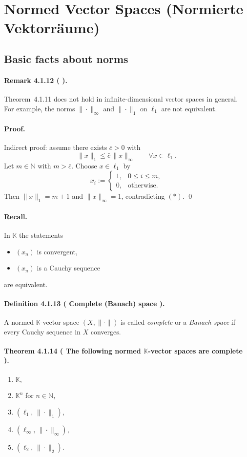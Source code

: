 \documentclass[12pt,a4paper]{article}
\newcommand{\N}{\mathbb{N}}
\newcommand{\K}{\mathbb{K}} %
\newcommand{\NumberedDefinition}[3]{%
\paragraph*{Definition #1 ( #2 ).} #3\par}
\newcommand{\NumberedTheorem}[3]{%
\paragraph*{Theorem #1 ( #2 ).} #3\par}
\newcommand{\NumberedRemark}[3]{%
\paragraph*{Remark #1 ( #2 ).} #3\par}
\theoremstyle{plain}
\theoremstyle{definition}
\theoremstyle{remark}
\begin{document}
\section{Normed Vector Spaces (Normierte Vektorräume)}

\subsection{Basic facts about norms}


\NumberedRemark{4.1.12}{}{Theorem~4.1.11 does not hold in infinite-dimensional vector spaces in general. For example, the norms $\|\cdot\|_\infty$ and $\|\cdot\|_1$ on $\ell_1$ are not equivalent.}
\paragraph{Proof.}
Indirect proof: assume there exists $\bar c>0$ with
\[
	\|x\|_{1} \le \bar c\,\|x\|_{\infty} \qquad \forall x\in\ell_{1}.\tag{$*$}
\]
Let $m\in\N$ with $m>\bar c$. Choose $x\in\ell_{1}$ by
\[
	x_i := \begin{cases} 1,& 0\le i\le m,\\ 0,& \text{otherwise.} \end{cases}
\]
Then $\|x\|_{1}=m+1$ and $\|x\|_{\infty}=1$, contradicting $(*)$. \qed

\paragraph{Recall.} In $\K$ the statements
\begin{itemize}[leftmargin=*]
	\item $(x_n)$ is convergent,
	\item $(x_n)$ is a Cauchy sequence
\end{itemize}
are equivalent.

\NumberedDefinition{4.1.13}{Complete (Banach) space}{A normed $\K$-vector space $(X,\|\cdot\|)$ is called \emph{complete} or a \emph{Banach space} if every Cauchy sequence in $X$ converges.}

\NumberedTheorem{4.1.14}{The following normed $\K$-vector spaces are complete}{\begin{enumerate}[label={(\arabic*)}, leftmargin=*]
	\item $\K$,
	\item $\K^{n}$ for $n\in\N$,
	\item $(\ell_{1},\,\|\cdot\|_{1})$,
	\item $(\ell_{\infty},\,\|\cdot\|_{\infty})$,
	\item $(\ell_{2},\,\|\cdot\|_{2})$.
\end{enumerate}}
\end{document}
